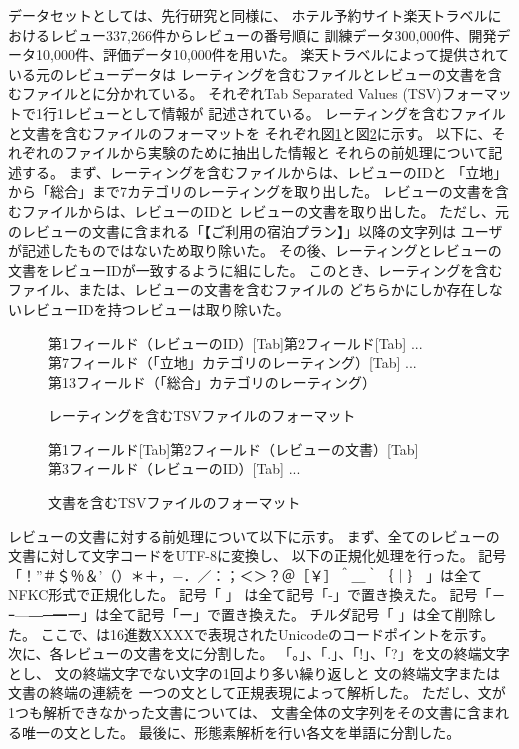 データセットとしては、先行研究\cite{fujitani15}と同様に、
ホテル予約サイト楽天トラベルにおけるレビュー337,266件からレビューの番号順に
訓練データ300,000件、開発データ10,000件、評価データ10,000件を用いた。
楽天トラベルによって提供されている元のレビューデータは
レーティングを含むファイルとレビューの文書を含むファイルとに分かれている。
それぞれTab Separated Values (TSV)フォーマットで1行1レビューとして情報が
記述されている。
レーティングを含むファイルと文書を含むファイルのフォーマットを
それぞれ図\ref{fig:RatingFileFormat}と図\ref{fig:DocumentFileFormat}に示す。
以下に、それぞれのファイルから実験のために抽出した情報と
それらの前処理について記述する。
まず、レーティングを含むファイルからは、レビューのIDと
「立地」から「総合」まで7カテゴリのレーティングを取り出した。
レビューの文書を含むファイルからは、レビューのIDと
レビューの文書を取り出した。
ただし、元のレビューの文書に含まれる「【ご利用の宿泊プラン】」以降の文字列は
ユーザが記述したものではないため取り除いた。
その後、レーティングとレビューの文書をレビューIDが一致するように組にした。
このとき、レーティングを含むファイル、または、レビューの文書を含むファイルの
どちらかにしか存在しないレビューIDを持つレビューは取り除いた。

\begin{figure}
  第1フィールド（レビューのID）{[Tab]}第2フィールド{[Tab]} ... \\
  第7フィールド（「立地」カテゴリのレーティング）{[Tab]} ... \\
  第13フィールド（「総合」カテゴリのレーティング）
  \caption{レーティングを含むTSVファイルのフォーマット}
  \label{fig:RatingFileFormat}
\end{figure}

\begin{figure}
  第1フィールド{[Tab]}第2フィールド（レビューの文書）{[Tab]} \\
  第3フィールド（レビューのID）{[Tab]} ...
  \caption{文書を含むTSVファイルのフォーマット}
  \label{fig:DocumentFileFormat}
\end{figure}

レビューの文書に対する前処理について以下に示す。
まず、全てのレビューの文書に対して文字コードをUTF-8に変換し、
以下の正規化処理を行った。
記号「！”＃＄％＆’（）＊＋，−．／：；＜＞？＠［￥］＾＿｀｛｜｝
」は全てNFKC形式で正規化した。
記号「
」
は全て記号「-」で置き換えた。
記号「－ｰ—―─━ー」は全て記号「ー」で置き換えた。
チルダ記号「
」は全て削除した。
ここで、は16進数XXXXで表現されたUnicodeのコードポイントを示す。
次に、各レビューの文書を文に分割した。
「。」、「.」、「!」、「?」を文の終端文字とし、
文の終端文字でない文字の1回より多い繰り返しと
文の終端文字または文書の終端の連続を
一つの文として正規表現によって解析した。
ただし、文が1つも解析できなかった文書については、
文書全体の文字列をその文書に含まれる唯一の文とした。
最後に、形態素解析を行い各文を単語に分割した。

